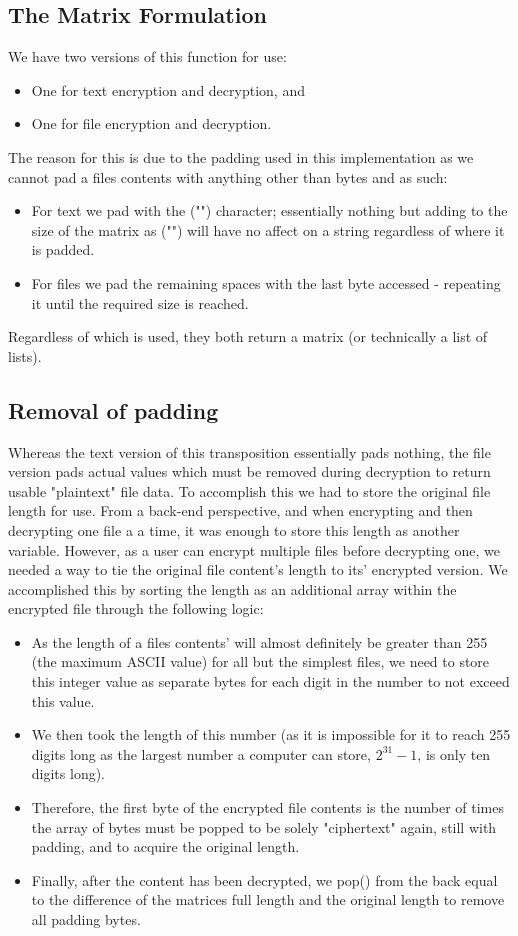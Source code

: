 \documentclass[a4paper, 12pt, titlepage]{report}
\begin{document}
\subsection{The Matrix Formulation}
We have two versions of this function for use:
\begin{itemize}
\item One for text encryption and decryption, and
\item One for file encryption and decryption.
\end{itemize}
The reason for this is due to the padding used in this implementation as we cannot pad a files contents with anything other than bytes and as such:
\begin{itemize}
\item For text we pad with the ("") character; essentially nothing but adding to the size of the matrix as ("") will have no affect on a string regardless of where it is padded.
\item For files we pad the remaining spaces with the last byte accessed - repeating it until the required size is reached.
\end{itemize}
Regardless of which is used, they both return a matrix (or technically a list of lists).
\subsection{Removal of padding}
Whereas the text version of this transposition essentially pads nothing, the file version pads actual values which must be removed during decryption to return usable "plaintext" file data. To accomplish this we had to store the original file length for use. From a back-end perspective, and when encrypting and then decrypting one file a a time, it was enough to store this length as another variable. However, as a user can encrypt multiple files before decrypting one, we needed a way to tie the original file content's length to its' encrypted version. We accomplished this by sorting the length as an additional array within the encrypted file through the following logic:
\begin{itemize}
\item As the length of a files contents' will almost definitely be greater than 255 (the maximum ASCII value) for all but the simplest files, we need to store this integer value as separate bytes for each digit in the number to not exceed this value.
\item We then took the length of this number (as it is impossible for it to reach 255 digits long as the largest number a computer can store, $2^31 - 1$, is only ten digits long).
\item Therefore, the first byte of the encrypted file contents is the number of times the array of bytes must be popped to be solely "ciphertext" again, still with padding, and to acquire the original length.
\item Finally, after the content has been decrypted, we pop() from the back equal to the difference of the matrices full length and the original length to remove all padding bytes.
\end{itemize}
\end{document}
